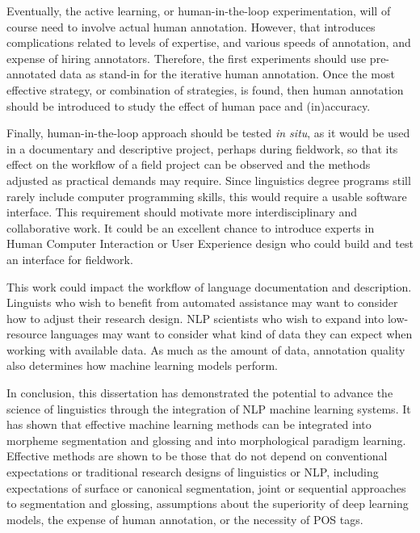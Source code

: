 
Eventually, the active learning, or human-in-the-loop experimentation, will of course need to involve actual human annotation. However, that introduces complications related to levels of expertise, and various speeds of annotation, and expense of hiring annotators. Therefore, the first experiments should use pre-annotated data as stand-in for the iterative human annotation. Once the most effective strategy, or combination of strategies, is found, then human annotation should be introduced to study the effect of human pace and (in)accuracy. 

Finally, human-in-the-loop approach should be tested \textit{in situ}, as it would be used in a documentary and descriptive project, perhaps during fieldwork, so that its effect on the workflow of a field project can be observed and the methods adjusted as practical demands may require. 
Since linguistics degree programs still rarely include computer programming skills, this would require a usable software interface. This requirement should motivate more interdisciplinary and collaborative work. It could be an excellent chance to introduce experts in Human Computer Interaction or User Experience design who could build and test an interface for fieldwork.

This work could impact the workflow of language documentation and description. Linguists who wish to benefit from automated assistance may want to consider how to adjust their research design. NLP scientists who wish to expand into low-resource languages may want to consider what kind of data they can expect when working with available data. As much as the amount of data, annotation quality also determines how machine learning models perform.

In conclusion, this dissertation has demonstrated the potential to advance the science of linguistics through the integration of NLP machine learning systems. It has shown that effective machine learning methods can be integrated into morpheme segmentation and glossing and into morphological paradigm learning. Effective methods are shown to be those that do not depend on conventional expectations or traditional research designs of linguistics or NLP, including expectations of surface or canonical segmentation, joint or sequential approaches to segmentation and glossing, assumptions about the superiority of deep learning models, the expense of human annotation, or the necessity of POS tags. 


